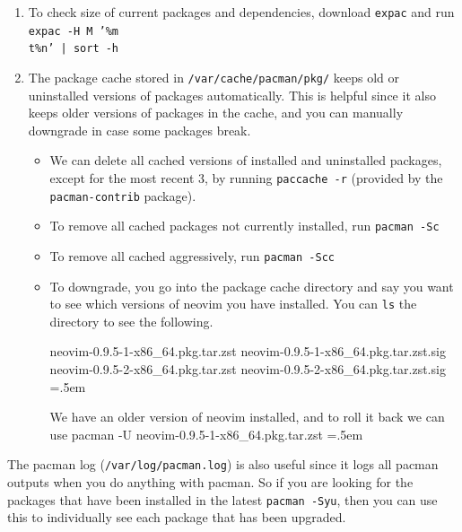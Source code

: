 \documentclass{article}
\theoremstyle{definition}
\newenvironment{cverbatim}
    {\SaveVerbatim{cverb}}
    {\endSaveVerbatim
    \flushleft\fboxrule=0pt\fboxsep=.5em
    \colorbox{cverbbg}{%
      \makebox[\dimexpr\linewidth-2\fboxsep][l]{\BUseVerbatim{cverb}}%
    }
    \endflushleft
  }
\begin{document}
\begin{enumerate}
        \item To check size of current packages and dependencies, download \texttt{expac} and run \texttt{expac -H M '\%m \\t\%n' | sort -h} 

        \item The package cache stored in \texttt{/var/cache/pacman/pkg/} keeps old or uninstalled versions of packages automatically. This is helpful since it also keeps older versions of packages in the cache, and you can manually downgrade in case some packages break.  
        \begin{itemize}
          \item We can delete all cached versions of installed and uninstalled packages, except for the most recent 3, by running \texttt{paccache -r} (provided by the \texttt{pacman-contrib} package). 
          \item To remove all cached packages not currently installed, run \texttt{pacman -Sc}
          \item To remove all cached aggressively, run \texttt{pacman -Scc}
          \item To downgrade, you go into the package cache directory and say you want to see which versions of neovim you have installed. You can \texttt{ls} the directory to see the following. 
          
            \begin{cverbatim}
              neovim-0.9.5-1-x86_64.pkg.tar.zst
              neovim-0.9.5-1-x86_64.pkg.tar.zst.sig
              neovim-0.9.5-2-x86_64.pkg.tar.zst
              neovim-0.9.5-2-x86_64.pkg.tar.zst.sig
            \end{cverbatim}

            We have an older version of neovim installed, and to roll it back we can use 
            \begin{cverbatim} 
              pacman -U neovim-0.9.5-1-x86_64.pkg.tar.zst
            \end{cverbatim}
        \end{itemize} 
      \end{enumerate}

      The pacman log (\texttt{/var/log/pacman.log}) is also useful since it logs all pacman outputs when you do anything with pacman. So if you are looking for the packages that have been installed in the latest \texttt{pacman -Syu}, then you can use this to individually see each package that has been upgraded. 
\end{document}
